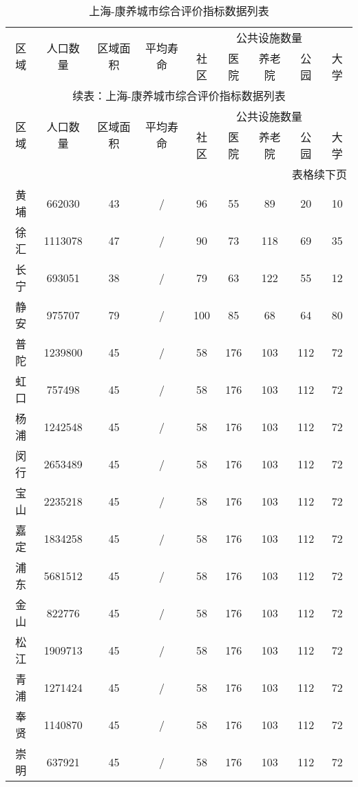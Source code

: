 \documentclass[12pt,a4paper]{article}
\begin{document}
\begin{longtable}{c|c|cc|ccccc}
\caption{上海-康养城市综合评价指标数据列表} \\
\toprule[2pt]
\multirow{2}{*}{区域} & \multirow{2}{*}{人口数量} & \multirow{2}{*}{区域面积}& \multirow{2}{*}{平均寿命}& \multicolumn{5}{c}{公共设施数量} \\
\cline{5-9}
& & & & 社区 & 医院 & 养老院 & 公园 & 大学 \\
\midrule[1pt]
\endfirsthead

\multicolumn{9}{c}{续表：上海-康养城市综合评价指标数据列表} \\
\toprule[2pt]
\multirow{2}{*}{区域} & \multirow{2}{*}{人口数量} & \multirow{2}{*}{区域面积}& \multirow{2}{*}{平均寿命}& \multicolumn{5}{c}{公共设施数量} \\
\cline{5-9}
& & & & 社区 & 医院 & 养老院 & 公园 & 大学 \\
\midrule[1pt]
\endhead

\hline
\multicolumn{9}{r}{表格续下页} \\
\endfoot

\hline
\endlastfoot

黄埔 & 662030 & 43 & / & 96 & 55 & 89 & 20 & 10 \\
徐汇 & 1113078 & 47 & / & 90 & 73 & 118 & 69 & 35 \\
长宁 & 693051 & 38 & / & 79 & 63 & 122 & 55 & 12 \\
静安 & 975707 & 79 & / & 100 & 85 & 68 & 64 & 80 \\
普陀 & 1239800 & 45 & / & 58 & 176 & 103 & 112 & 72 \\
虹口 & 757498 & 45 & / & 58 & 176 & 103 & 112 & 72 \\
杨浦 & 1242548 & 45 & / & 58 & 176 & 103 & 112 & 72 \\
闵行 & 2653489 & 45 & / & 58 & 176 & 103 & 112 & 72 \\
宝山 & 2235218 & 45 & / & 58 & 176 & 103 & 112 & 72 \\
嘉定 & 1834258 & 45 & / & 58 & 176 & 103 & 112 & 72 \\
浦东 & 5681512 & 45 & / & 58 & 176 & 103 & 112 & 72 \\
金山 & 822776 & 45 & / & 58 & 176 & 103 & 112 & 72 \\
松江 & 1909713 & 45 & / & 58 & 176 & 103 & 112 & 72 \\
青浦 & 1271424 & 45 & / & 58 & 176 & 103 & 112 & 72 \\
奉贤 & 1140870 & 45 & / & 58 & 176 & 103 & 112 & 72 \\
崇明 & 637921 & 45 & / & 58 & 176 & 103 & 112 & 72 \\

\bottomrule[2pt]

\end{longtable}
\end{document}
